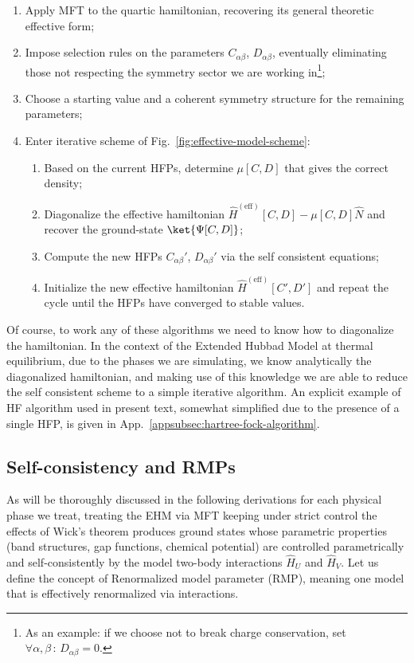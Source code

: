 \begin{enumerate}
	\item Apply MFT to the quartic hamiltonian, recovering its general theoretic effective form;
	\item Impose selection rules on the parameters $C_{\alpha\beta}$, $D_{\alpha\beta}$, eventually eliminating those not respecting the symmetry sector we are working in\footnote{
		As an example: if we choose not to break charge conservation, set $\forall\alpha,\beta\,\colon\,D_{\alpha\beta}=0$.
	};
	\item Choose a starting value and a coherent symmetry structure for the remaining parameters;
	\item Enter iterative scheme of Fig.~\ref{fig:effective-model-scheme}:
	\begin{enumerate}
		\item Based on the current HFPs, determine $\mu [C,D]$ that gives the correct density;
		\item Diagonalize the effective hamiltonian $\hat H^{(\mathrm{eff})}[C,D] - \mu[C,D] \hat N$ and recover the ground-state $\ket{\Psi [C,D]}$;
		\item Compute the new HFPs $C_{\alpha\beta}'$, $D_{\alpha\beta}'$ via the self consistent equations;
		\item Initialize the new effective hamiltonian $\hat H^{(\mathrm{eff})}[C',D']$ and repeat the cycle until the HFPs have converged to stable values.
	\end{enumerate}
\end{enumerate}
Of course, to work any of these algorithms we need to know how to diagonalize the hamiltonian. In the context of the Extended Hubbad Model at thermal equilibrium, due to the phases we are simulating, we know analytically the diagonalized hamiltonian, and making use of this knowledge we are able to reduce the self consistent scheme to a simple iterative algorithm. An explicit example of HF algorithm used in present text, somewhat simplified due to the presence of a single HFP, is given in App.~\ref{appsubsec:hartree-fock-algorithm}.

\subsection{Self-consistency and RMPs}

As will be thoroughly discussed in the following derivations for each physical phase we treat, treating the EHM via MFT keeping under strict control the effects of Wick's theorem produces ground states whose parametric properties (band structures, gap functions, chemical potential) are controlled parametrically and self-consistently by the model two-body interactions $\hat H_U$ and $\hat H_V$. Let us define the concept of Renormalized model parameter (RMP), meaning one model that is effectively renormalized via interactions. 


